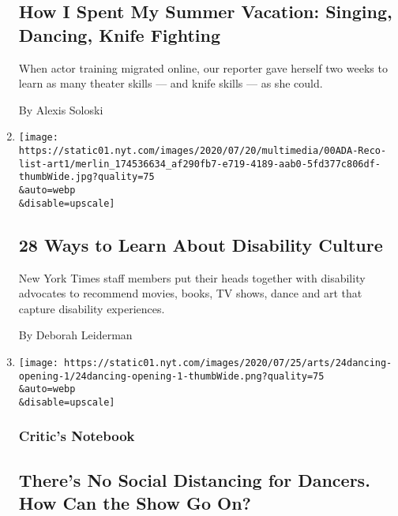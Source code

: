 \begin{enumerate}
{  \subsection{How I Spent My Summer Vacation: Singing, Dancing, Knife
  Fighting}\label{how-i-spent-my-summer-vacation-singing-dancing-knife-fighting}}

  When actor training migrated online, our reporter gave herself two
  weeks to learn as many theater skills --- and knife skills --- as she
  could.

  By Alexis Soloski
\item
  \href{/2020/07/24/arts/disability-movies-books-tv.html}{}

  \texttt{[image: https://static01.nyt.com/images/2020/07/20/multimedia/00ADA-Reco-list-art1/merlin\_174536634\_af290fb7-e719-4189-aab0-5fd377c806df-thumbWide.jpg?quality=75\\\&auto=webp\\\&disable=upscale]}

  \hypertarget{28-ways-to-learn-about-disability-culture}{%
  \subsection{28 Ways to Learn About Disability
  Culture}\label{28-ways-to-learn-about-disability-culture}}

  New York Times staff members put their heads together with disability
  advocates to recommend movies, books, TV shows, dance and art that
  capture disability experiences.

  By Deborah Leiderman
\item
  \href{/2020/07/24/arts/dance/safety-protocols-dance-coronavirus.html}{}

  \texttt{[image: https://static01.nyt.com/images/2020/07/25/arts/24dancing-opening-1/24dancing-opening-1-thumbWide.png?quality=75\\\&auto=webp\\\&disable=upscale]}

  \hypertarget{critics-notebook}{%
  \subsubsection{Critic's Notebook}\label{critics-notebook}}

  \hypertarget{theres-no-social-distancing-for-dancers-how-can-the-show-go-on}{%
  \subsection{There's No Social Distancing for Dancers. How Can the Show
  Go
  On?}\label{theres-no-social-distancing-for-dancers-how-can-the-show-go-on}}


\end{enumerate}
